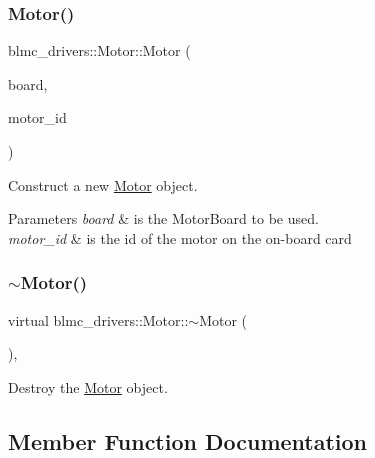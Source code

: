 \subsubsection{\texorpdfstring{Motor()}{Motor()}}
{\footnotesize\ttfamily blmc\+\_\+drivers\+::\+Motor\+::\+Motor (\begin{DoxyParamCaption}\item[{\hyperlink{classblmc__drivers_1_1MotorInterface_ae31f230b9da3674a05543023c90b124c}{Ptr}$<$ \hyperlink{classblmc__drivers_1_1MotorBoardInterface}{Motor\+Board\+Interface} $>$}]{board,  }\item[{bool}]{motor\+\_\+id }\end{DoxyParamCaption})}



Construct a new \hyperlink{classblmc__drivers_1_1Motor}{Motor} object. 


\begin{DoxyParams}{Parameters}
{\em board} & is the Motor\+Board to be used. \\
\hline
{\em motor\+\_\+id} & is the id of the motor on the on-\/board card \\
\hline
\end{DoxyParams}
\mbox{\label{classblmc__drivers_1_1Motor_ad93b64d54b40ff12df7081e009c71239}} 
\subsubsection{\texorpdfstring{$\sim$\+Motor()}{~Motor()}}
{\footnotesize\ttfamily virtual blmc\+\_\+drivers\+::\+Motor\+::$\sim$\+Motor (\begin{DoxyParamCaption}{ }\end{DoxyParamCaption})\hspace{0.3cm}{\ttfamily [inline]}, {\ttfamily [virtual]}}



Destroy the \hyperlink{classblmc__drivers_1_1Motor}{Motor} object. 



\subsection{Member Function Documentation}
\mbox{\label{classblmc__drivers_1_1Motor_ace26e74e3c8072c8bee867a2a0a7e013}} 

